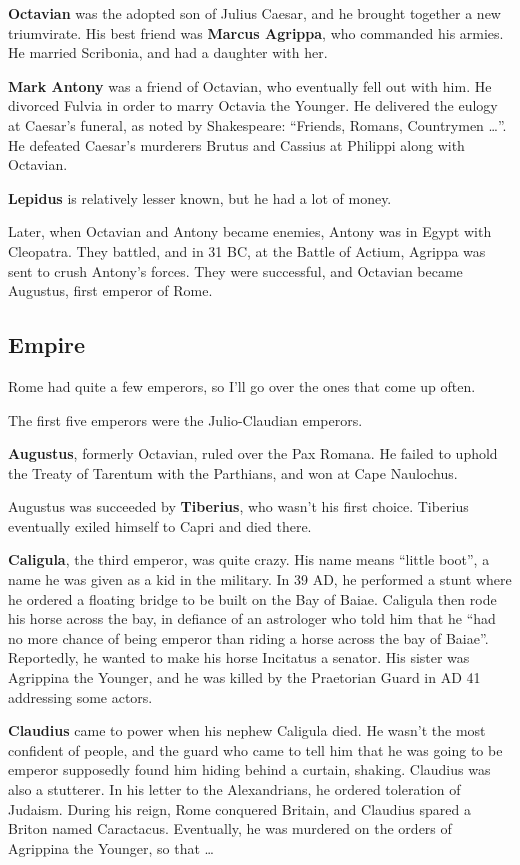 \textbf{Octavian} was the adopted son of Julius Caesar, and he brought together a new triumvirate.
His best friend was \textbf{Marcus Agrippa}, who commanded his armies.
He married Scribonia, and had a daughter with her.

\textbf{Mark Antony} was a friend of Octavian, who eventually fell out with him.
He divorced Fulvia in order to marry Octavia the Younger.
He delivered the eulogy at Caesar's funeral, as noted by Shakespeare:
``Friends, Romans, Countrymen \ldots''.
He defeated Caesar's murderers Brutus and Cassius at Philippi along with Octavian.

\textbf{Lepidus} is relatively lesser known, but he had a lot of money.

Later, when Octavian and Antony became enemies, Antony was in Egypt with Cleopatra.
They battled, and in 31 BC, at the Battle of Actium, Agrippa was sent to crush Antony's forces.
They were successful, and Octavian became Augustus, first emperor of Rome.

\subsection*{Empire}

Rome had quite a few emperors, so I'll go over the ones that come up often.

The first five emperors were the Julio-Claudian emperors.

\textbf{Augustus}, formerly Octavian, ruled over the Pax Romana.
He failed to uphold the Treaty of Tarentum with the Parthians, and won at Cape Naulochus.

Augustus was succeeded by \textbf{Tiberius}, who wasn't his first choice.
Tiberius eventually exiled himself to Capri and died there.

\textbf{Caligula}, the third emperor, was quite crazy.
His name means ``little boot'', a name he was given as a kid in the military.
In 39 AD, he performed a stunt where he ordered a floating bridge to be built on the Bay of Baiae.
Caligula then rode his horse across the bay, in defiance of an astrologer who told him that he
``had no more chance of being emperor than riding a horse across the bay of Baiae''.
Reportedly, he wanted to make his horse Incitatus a senator.
His sister was Agrippina the Younger, and he was killed by the Praetorian Guard in AD 41 addressing some actors.

\textbf{Claudius} came to power when his nephew Caligula died.
He wasn't the most confident of people, and the guard who came to tell
him that he was going to be emperor supposedly found him hiding behind a curtain, shaking.
Claudius was also a stutterer.
In his letter to the Alexandrians, he ordered toleration of Judaism.
During his reign, Rome conquered Britain, and Claudius spared a Briton named Caractacus.
Eventually, he was murdered on the orders of Agrippina the Younger, so that \ldots

